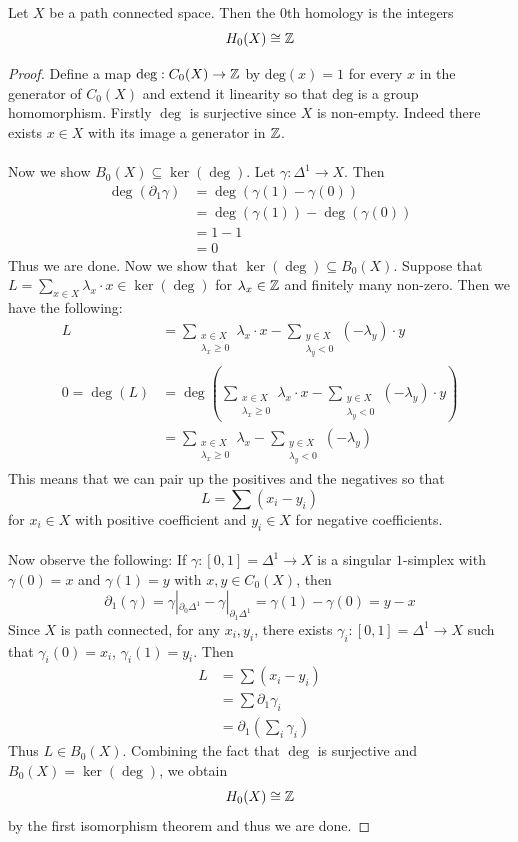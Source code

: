 \documentclass[a4paper]{article}
\begin{document}
\begin{lmm}{}{} Let $X$ be a path connected space. Then the $0$th homology is the integers $$H_0(X)\cong\mathbb{Z}$$ \tcbline
\begin{proof}
Define a map $\text{deg}:C_0(X)\to\mathbb{Z}$ by $\text{deg}(x)=1$ for every $x$ in the generator of $C_0(X)$ and extend it linearity so that $\text{deg}$ is a group homomorphism. Firstly $\deg$ is surjective since $X$ is non-empty. Indeed there exists $x\in X$ with its image a generator in $\mathbb{Z}$. \\~\\

Now we show $B_0(X)\subseteq\ker(\deg)$. Let $\gamma:\Delta^1\to X$. Then 
\begin{align*}
\deg(\partial_1\gamma)&=\deg(\gamma(1)-\gamma(0))\\
&=\deg(\gamma(1))-\deg(\gamma(0))\\
&=1-1\\
&=0
\end{align*}
Thus we are done. Now we show that $\ker(\deg)\subseteq B_0(X)$. Suppose that $L=\sum_{x\in X}\lambda_x\cdot x\in\ker(\deg)$ for $\lambda_x\in\mathbb{Z}$ and finitely many non-zero. Then we have the following: 
\begin{align*}
L&=\sum_{\substack{x\in X\\\lambda_x\geq 0}}\lambda_x\cdot x-\sum_{\substack{y\in X\\\lambda_y<0}}(-\lambda_y)\cdot y\\
0=\deg(L)&=\deg\left(\sum_{\substack{x\in X\\\lambda_x\geq 0}}\lambda_x\cdot x-\sum_{\substack{y\in X\\\lambda_y<0}}(-\lambda_y)\cdot y\right)\\
&=\sum_{\substack{x\in X\\\lambda_x\geq 0}}\lambda_x-\sum_{\substack{y\in X\\\lambda_y<0}}(-\lambda_y)
\end{align*}
This means that we can pair up the positives and the negatives so that $$L=\sum(x_i-y_i)$$ for $x_i\in X$ with positive coefficient and $y_i\in X$ for negative coefficients. \\~\\ 

Now observe the following: If $\gamma:[0,1]=\Delta^1\to X$ is a singular $1$-simplex with $\gamma(0)=x$ and $\gamma(1)=y$ with $x,y\in C_0(X)$, then $$\partial_1(\gamma)=\gamma|_{\partial_0\Delta^1}-\gamma|_{\partial_1\Delta^1}=\gamma(1)-\gamma(0)=y-x$$ Since $X$ is path connected, for any $x_i,y_i$, there exists $\gamma_i:[0,1]=\Delta^1\to X$ such that $\gamma_i(0)=x_i$, $\gamma_i(1)=y_i$. Then 
\begin{align*}
L&=\sum(x_i-y_i)\\
&=\sum\partial_1\gamma_i\\
&=\partial_1\left(\sum_i\gamma_i\right)
\end{align*}
Thus $L\in B_0(X)$. Combining the fact that $\deg$ is surjective and $B_0(X)=\ker(\deg)$, we obtain $$H_0(X)\cong\mathbb{Z}$$ by the first isomorphism theorem and thus we are done. 
\end{proof}
\end{lmm}
\end{document}
